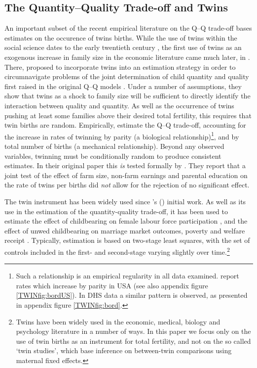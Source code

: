 \documentclass[subeqn]{article}
\begin{document}
\begin{spacing}{1.4}
\subsection*{The Quantity--Quality Trade-off and Twins}
An important subset of the recent empirical literature on the Q--Q trade-off
bases estimates on the occurence of twins births.  While the use of twins within
the social science dates to the early twentieth century \citep{Thorndike1905}, the
first use of twins as an exogenous increase in family size in the economic
literature came much later, in \citet{RosenzweigWolpin1980}. There,
\citet{RosenzweigWolpin1980} proposed to incorporate twins into an estimation
strategy in order to circumnavigate problems of the joint determination of child 
quantity and quality first raised in the original Q--Q models \citep{BeckerLewis1973,
Willis1973,DeTray1973,BeckerTomes1976}.  Under a number of assumptions, they show 
that twins as a shock to family size will be sufficient to directly identify the 
interaction between quality and quantity.  As well as the occurrence of twins 
pushing at least some families above their desired total fertility, this requires 
that twin births are random.  Empirically, \citet{RosenzweigWolpin1980} 
estimate the Q--Q trade-off, accounting for the increase in rates of twinning by 
parity (a biological relationship)\footnote{Such a relationship is an empirical
  regularity in all data examined. \citet{RosenzweigWolpin1980} report rates which
  increase by parity in USA (see also appendix figure \ref{TWINfig:bordUS}).  In
  DHS data a similar pattern is observed, as presented in appendix figure
  \ref{TWINfig:bord}.}, and by total number of births (a mechanical relationship).
Beyond any observed variables, twinning must be conditionally random to produce
consistent estimates. In their original paper this \emph{is} tested formally by
\citet{RosenzweigWolpin1980}.  They report that a joint test of the effect of
farm size, non-farm earnings and parental education on the rate of twins per
births did \emph{not} allow for the rejection of no significant effect.

The twin instrument has been widely used since \citeauthor{RosenzweigWolpin1980}'s
(\citeyear{RosenzweigWolpin1980}) initial work. As well as its use in the 
estimation of the quantity-quality trade-off, it has been used to estimate the
effect of childbearing on female labour force participation
\citep{RosenzweigWolpin1980b,Jacobsenetal1999,AngristEvans1998}, and the effect 
of unwed childbearing on marriage market outcomes, poverty and welfare receipt 
\citep{BronarsGrogger1994}.  Typically, estimation is based on two-stage least
squares, with the set of controls included in the first- and second-stage 
varying slightly over time.\footnote{Twins have been widely used in the economic, 
medical, biology and psychology literature in a number of ways.  In this paper 
we focus only on the use of twin births as an instrument for total fertility, 
and not on the so called `twin studies', which base inference on between-twin 
comparisons using maternal fixed effects.}


\end{spacing}
\end{document}
